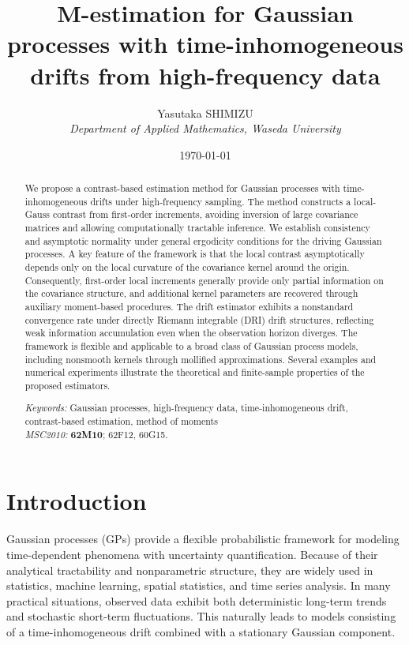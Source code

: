 \documentclass[a4paper,10pt,twoside]{article}
\title{M-estimation for Gaussian processes with time-inhomogeneous drifts from high-frequency data}
\author{Yasutaka SHIMIZU\\ {\it Department of Applied Mathematics, Waseda University}}
\date{\today}
\numberwithin{equation}{section}
\begin{document}
\maketitle

\begin{abstract} 
We propose a contrast-based estimation method for Gaussian processes with time-inhomogeneous drifts under high-frequency sampling.
The method constructs a local-Gauss contrast from first-order increments, avoiding inversion of large covariance matrices and allowing computationally tractable inference.
We establish consistency and asymptotic normality under general ergodicity conditions for the driving Gaussian processes.
A key feature of the framework is that the local contrast asymptotically depends only on the local curvature of the covariance kernel around the origin.
Consequently, first-order local increments generally provide only partial information on the covariance structure, and additional kernel parameters are recovered through auxiliary moment-based procedures.
The drift estimator exhibits a nonstandard convergence rate under directly Riemann integrable (DRI) drift structures, reflecting weak information accumulation even when the observation horizon diverges.
The framework is flexible and applicable to a broad class of Gaussian process models, including nonsmooth kernels through mollified approximations.
Several examples and numerical experiments illustrate the theoretical and finite-sample properties of the proposed estimators.

\begin{flushleft}
{ \it Keywords:} Gaussian processes, high-frequency data, time-inhomogeneous drift, contrast-based estimation, method of moments
\vspace{1mm}\\
{\it MSC2010:} {\bf 62M10}; 62F12,  60G15.
\end{flushleft}
\end{abstract} 


\section{Introduction}

Gaussian processes (GPs) provide a flexible probabilistic framework for modeling time-dependent phenomena with uncertainty quantification.
Because of their analytical tractability and nonparametric structure, they are widely used in statistics, machine learning, spatial statistics, and time series analysis. 
In many practical situations, observed data exhibit both deterministic long-term trends and stochastic short-term fluctuations.
This naturally leads to models consisting of a time-inhomogeneous drift combined with a stationary Gaussian component.
\end{document}

